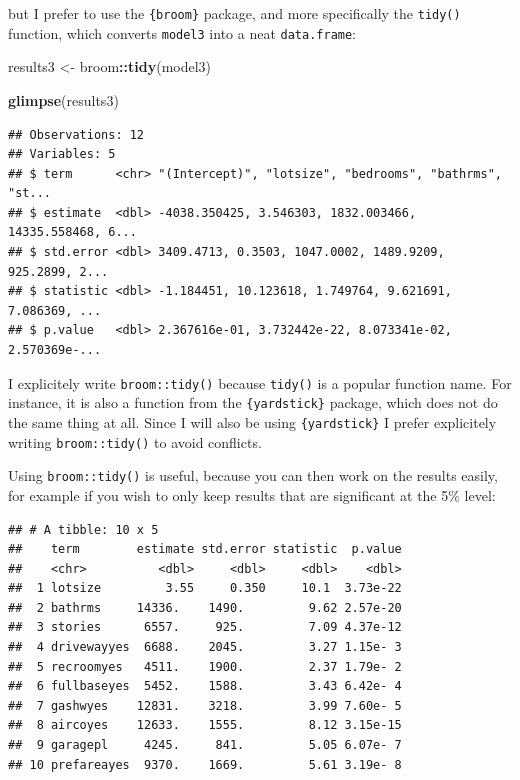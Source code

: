 \documentclass[]{gitbook}
\newenvironment{Shaded}{\begin{snugshade}}{\end{snugshade}}
\newcommand{\FloatTok}[1]{\textcolor[rgb]{0.00,0.00,0.81}{#1}}
\newcommand{\KeywordTok}[1]{\textcolor[rgb]{0.13,0.29,0.53}{\textbf{#1}}}
\newcommand{\NormalTok}[1]{#1}
\newcommand{\OperatorTok}[1]{\textcolor[rgb]{0.81,0.36,0.00}{\textbf{#1}}}
\newcommand{\StringTok}[1]{\textcolor[rgb]{0.31,0.60,0.02}{#1}}
\begin{document}
but I prefer to use the \texttt{\{broom\}} package, and more specifically the \texttt{tidy()} function, which
converts \texttt{model3} into a neat \texttt{data.frame}:

\begin{Shaded}
\begin{Highlighting}[]
\NormalTok{results3 <-}\StringTok{ }\NormalTok{broom}\OperatorTok{::}\KeywordTok{tidy}\NormalTok{(model3)}

\KeywordTok{glimpse}\NormalTok{(results3)}
\end{Highlighting}
\end{Shaded}

\begin{verbatim}
## Observations: 12
## Variables: 5
## $ term      <chr> "(Intercept)", "lotsize", "bedrooms", "bathrms", "st...
## $ estimate  <dbl> -4038.350425, 3.546303, 1832.003466, 14335.558468, 6...
## $ std.error <dbl> 3409.4713, 0.3503, 1047.0002, 1489.9209, 925.2899, 2...
## $ statistic <dbl> -1.184451, 10.123618, 1.749764, 9.621691, 7.086369, ...
## $ p.value   <dbl> 2.367616e-01, 3.732442e-22, 8.073341e-02, 2.570369e-...
\end{verbatim}

I explicitely write \texttt{broom::tidy()} because \texttt{tidy()} is a popular function name. For instance,
it is also a function from the \texttt{\{yardstick\}} package, which does not do the same thing at all. Since
I will also be using \texttt{\{yardstick\}} I prefer explicitely writing \texttt{broom::tidy()} to avoid conflicts.

Using \texttt{broom::tidy()} is useful, because you can then work on the results easily, for example if
you wish to only keep results that are significant at the 5\% level:

\begin{Shaded}
\end{Shaded}

\begin{verbatim}
## # A tibble: 10 x 5
##    term        estimate std.error statistic  p.value
##    <chr>          <dbl>     <dbl>     <dbl>    <dbl>
##  1 lotsize         3.55     0.350     10.1  3.73e-22
##  2 bathrms     14336.    1490.         9.62 2.57e-20
##  3 stories      6557.     925.         7.09 4.37e-12
##  4 drivewayyes  6688.    2045.         3.27 1.15e- 3
##  5 recroomyes   4511.    1900.         2.37 1.79e- 2
##  6 fullbaseyes  5452.    1588.         3.43 6.42e- 4
##  7 gashwyes    12831.    3218.         3.99 7.60e- 5
##  8 aircoyes    12633.    1555.         8.12 3.15e-15
##  9 garagepl     4245.     841.         5.05 6.07e- 7
## 10 prefareayes  9370.    1669.         5.61 3.19e- 8
\end{verbatim}
\end{document}
